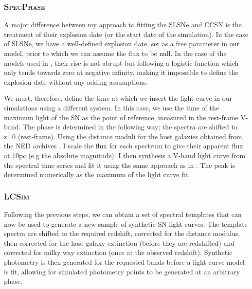 \subsubsection{\textsc{SpecPhase}}
A major difference between my approach to fitting the SLSNe and CCSN is the treatment of their explosion date (or the start date of the simulation). In the case of SLSNe, we have a well-defined explosion date, set as a free parameter in our model, prior to which we can assume the flux to be null. In the case of the models used in , their rise is not abrupt but following a logistic function which only tends towards zero at negative infinity, making it impossible to define the explosion date without any adding assumptions.

We must, therefore, define the time at which we insert the light curve in our simulations using a different system. In this case, we use the time of the maximum light of the SN as the point of reference, measured in the rest-frame V-band. The phase is determined in the following way; the spectra are shifted to z=0 (rest-frame). Using the distance moduli for the host galaxies obtained from the NED archives \citep{Tully1988}. I scale the flux for each spectrum to give their apparent flux at 10pc (e.g the absolute magnitude). I then synthesis a V-band light curve from the spectral time series and fit it using the same approach as in . The peak is determined numerically as the maximum of the light curve fit.

\subsubsection{\textsc{LCSim}}
Following the previous steps, we can obtain a set of spectral templates that can now be used to generate a new sample of synthetic SN light curves. The template spectra are shifted to the required redshift, corrected for the distance modulus, then corrected for the host galaxy extinction (before they are redshifted) and corrected for milky way extinction (once at the observed redshift). Synthetic photometry is then generated for the requested bands before a light curve model is fit, allowing for simulated photometry points to be generated at an arbitrary phase.

